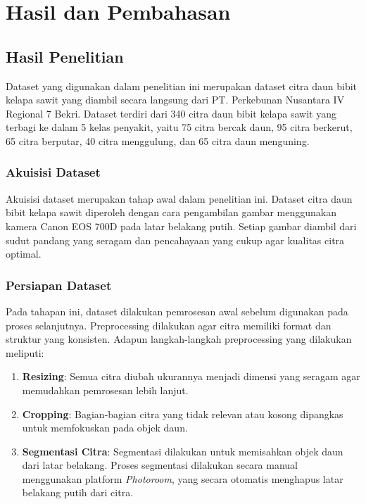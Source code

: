 \newpage
\chapter{Hasil dan Pembahasan} \label{Bab IV}

\section{Hasil Penelitian} \label{IV.Hasil Penelitian}
Dataset yang digunakan dalam penelitian ini merupakan dataset citra daun bibit kelapa sawit yang diambil secara langsung dari PT. Perkebunan Nusantara IV Regional 7 Bekri. Dataset terdiri dari 340 citra daun bibit kelapa sawit yang terbagi ke dalam 5 kelas penyakit, yaitu 75 citra bercak daun, 95 citra berkerut, 65 citra berputar, 40 citra menggulung, dan 65 citra daun menguning. 


\subsection{Akuisisi Dataset} \label{IV.Akuisisi Dataset}
Akuisisi dataset merupakan tahap awal dalam penelitian ini. Dataset citra daun bibit kelapa sawit diperoleh dengan cara pengambilan gambar menggunakan kamera Canon EOS 700D pada latar belakang putih. Setiap gambar diambil dari sudut pandang yang seragam dan pencahayaan yang cukup agar kualitas citra optimal.

\subsection{Persiapan Dataset} \label{IV.Persiapan Dataset}
Pada tahapan ini, dataset dilakukan pemrosesan awal sebelum digunakan pada proses selanjutnya. Preprocessing dilakukan agar citra memiliki format dan struktur yang konsisten. Adapun langkah-langkah preprocessing yang dilakukan meliputi:

\begin{enumerate}
  \item {\textbf{Resizing}: Semua citra diubah ukurannya menjadi dimensi yang seragam agar memudahkan pemrosesan lebih lanjut.}
  \item {\textbf{Cropping}: Bagian-bagian citra yang tidak relevan atau kosong dipangkas untuk memfokuskan pada objek daun.}
  \item {\textbf{Segmentasi Citra}: Segmentasi dilakukan untuk memisahkan objek daun dari latar belakang. Proses segmentasi dilakukan secara manual menggunakan platform \textit{Photoroom}, yang secara otomatis menghapus latar belakang putih dari citra.}
\end{enumerate}



